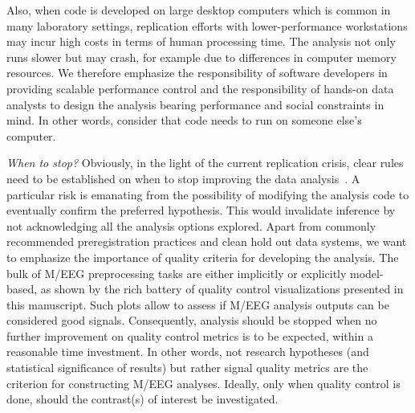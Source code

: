 Also, when code is developed on large desktop computers which is common in many laboratory settings, replication efforts with lower-performance workstations may incur high costs in terms of human processing time. The analysis not only runs slower but may crash, for example due to differences in computer memory resources. We therefore emphasize the responsibility of software developers in providing scalable performance control and the responsibility of hands-on data analysts to design the analysis bearing performance and social constraints in mind. In other words, consider that code needs to run on someone else's computer.


\emph{When to stop?} Obviously, in the light of the current replication crisis, clear rules need to be established on when to stop improving the data analysis~\citep{simmons2011,szucs2017}. A particular risk is emanating from the possibility of modifying the analysis code to eventually confirm the preferred hypothesis. This would invalidate inference by not acknowledging all the analysis options explored. Apart from commonly recommended preregistration practices and clean hold out data systems, we want to emphasize the importance of quality criteria for developing the analysis. The bulk of M/EEG preprocessing tasks are either implicitly or explicitly model-based, as shown by the rich battery of quality control visualizations presented in this manuscript. Such plots allow to assess if M/EEG analysis outputs can be considered good signals. Consequently, analysis should be stopped when no further improvement on quality control metrics is to be expected, within a reasonable time investment. In other words, not research hypotheses (and statistical significance of results) but rather signal quality metrics are the criterion for constructing M/EEG analyses. Ideally, only when quality control is done, should the contrast(s) of interest be investigated.

